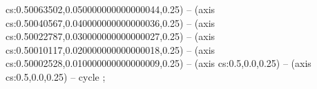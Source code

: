 cs:0.50063502,0.050000000000000044,0.25) -- (axis cs:0.50040567,0.040000000000000036,0.25) -- (axis cs:0.50022787,0.030000000000000027,0.25) -- (axis cs:0.50010117,0.020000000000000018,0.25) -- (axis cs:0.50002528,0.010000000000000009,0.25) -- (axis cs:0.5,0.0,0.25) -- (axis cs:0.5,0.0,0.25) -- cycle
;
